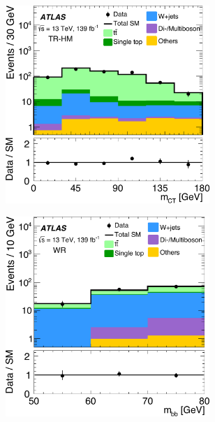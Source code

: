 \begin{figure}
	\begin{subfigure}[b]{0.5\linewidth}
		\centering\includegraphics[width=0.85\textwidth]{OneLeptonbb_CR_TRHMEM_mct2_yellow}
	\end{subfigure}\hfill
	\begin{subfigure}[b]{0.5\linewidth}
		\centering\includegraphics[width=0.85\textwidth]{OneLeptonbb_CR_WREM_mbb_yellow}
	\end{subfigure}\hfill
	\par\medskip
	\begin{subfigure}[b]{0.5\linewidth}

\end{subfigure}
\end{figure}
